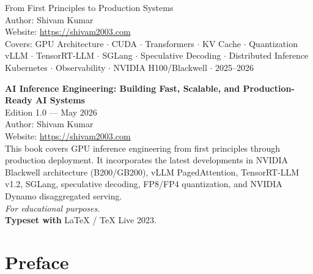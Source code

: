 \documentclass[10pt, oneside, openany]{book}
\begin{document}
\vspace{1cm}
\begin{center}
  {\Large\color{NavyBlue} From First Principles to Production Systems}\\[1em]
  {\normalsize\color{DarkGray} Author: Shivam Kumar \\ Website: \url{https://shivam2003.com}}\\[1em]
  {\normalsize\color{MidGray}
   Covers: GPU Architecture $\cdot$ CUDA $\cdot$ Transformers $\cdot$ KV Cache $\cdot$
   Quantization\\
   vLLM $\cdot$ TensorRT-LLM $\cdot$ SGLang $\cdot$ Speculative Decoding $\cdot$
   Distributed Inference\\
   Kubernetes $\cdot$ Observability $\cdot$ NVIDIA H100/Blackwell $\cdot$ 2025--2026
  }
\end{center}

\clearpage

\thispagestyle{empty}
\vspace*{\fill}
{\small
\noindent\textbf{AI Inference Engineering: Building Fast, Scalable, and Production-Ready AI Systems}\\[0.5em]
\noindent Edition 1.0 --- May 2026\\[0.5em]
\noindent Author: Shivam Kumar\\
\noindent Website: \url{https://shivam2003.com}\\[0.5em]
\noindent This book covers GPU inference engineering from first principles through
production deployment.  It incorporates the latest developments in NVIDIA Blackwell
architecture (B200/GB200), vLLM PagedAttention, TensorRT-LLM v1.2, SGLang, speculative
decoding, FP8/FP4 quantization, and NVIDIA Dynamo disaggregated serving.\\[0.5em]
\noindent \textit{For educational purposes.}\\[1em]
\noindent \textbf{Typeset with} \LaTeX{} / TeX Live 2023.
}
\vspace*{\fill}
\clearpage

\tableofcontents
\clearpage

\chapter*{Preface}
\end{document}
